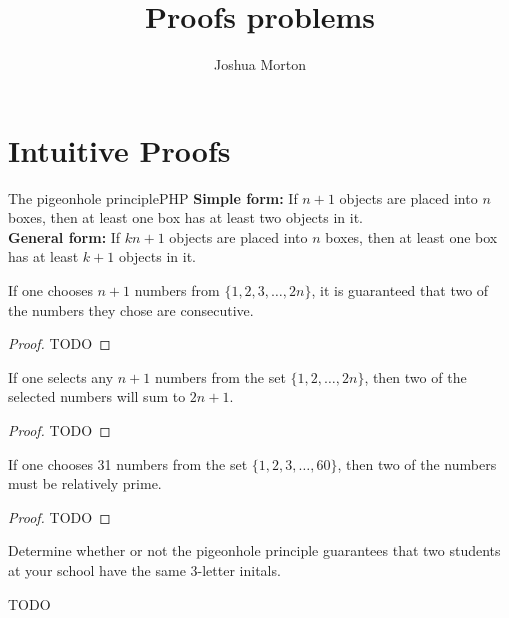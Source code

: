 \documentclass{report}
\begin{document}
\title{Proofs problems}
\author{Joshua Morton}
\maketitle

\chapter{Intuitive Proofs}


\begin{fact}{The pigeonhole principle}{PHP}
  \textbf{Simple form:} If $n + 1$ objects are placed into $n$ boxes, then at least one box has at least two objects in it. \\
  \textbf{General form:} If $kn + 1$ objects are placed into $n$ boxes, then at least one box has at least $k + 1$ objects in it.
\end{fact}

\begin{proposition*}{}
  If one chooses $n+1$ numbers from $\{1, 2, 3, \ldots, 2n\}$, it is guaranteed that two of the numbers they chose are consecutive.
\end{proposition*}

\begin{proof}
  TODO
\end{proof}

\begin{proposition*}{}
  If one selects any $n + 1$ numbers from the set $\{1, 2,\ldots,2n\}$, then two of the selected numbers will sum to $2n + 1.$
\end{proposition*}

\begin{proof}
  TODO
\end{proof}

\begin{proposition*}{}
  If one chooses 31 numbers from the set $\{1,2,3,\ldots,60\}$, then two of the numbers must be relatively prime.
\end{proposition*}

\begin{proof}
  TODO
\end{proof}

\begin{problem*}{}
  Determine whether or not the pigeonhole principle guarantees that two students at your school have the same 3-letter initals.
\end{problem*}

TODO
\end{document}
